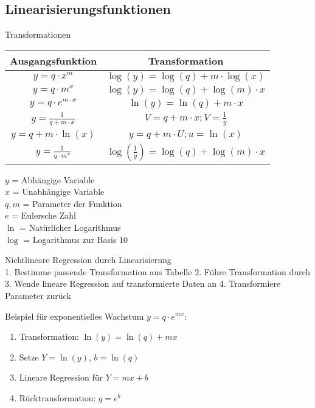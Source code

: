 \subsection{Linearisierungsfunktionen}
\begin{concept}{Transformationen}\\
\begin{center}
\begin{tabular}{|c|c|}
\hline
Ausgangsfunktion & Transformation \\
\hline
$y=q \cdot x^m$ & $\log(y)=\log(q)+m \cdot \log(x)$ \\
\hline
$y=q \cdot m^x$ & $\log(y)=\log(q)+\log(m) \cdot x$ \\
\hline
$y=q \cdot e^{m \cdot x}$ & $\ln(y)=\ln(q)+m \cdot x$ \\
\hline
$y=\frac{1}{q+m \cdot x}$ & $V=q+m \cdot x; V=\frac{1}{y}$ \\
\hline
$y=q+m \cdot \ln(x)$ & $y=q+m \cdot U; u=\ln(x)$ \\
\hline
$y=\frac{1}{q \cdot m^x}$ & $\log(\frac{1}{y})=\log(q)+\log(m) \cdot x$ \\
\hline
\end{tabular}
\end{center}
$y$ = Abhängige Variable\\
$x$ = Unabhängige Variable\\
$q, m$ = Parameter der Funktion\\
$e$ = Eulersche Zahl\\
$\ln$ = Natürlicher Logarithmus\\
$\log$ = Logarithmus zur Basis 10\\
\end{concept}

\begin{KR}{Nichtlineare Regression durch Linearisierung}\\
1. Bestimme passende Transformation aus Tabelle
2. Führe Transformation durch
3. Wende lineare Regression auf transformierte Daten an
4. Transformiere Parameter zurück

Beispiel für exponentielles Wachstum $y=q \cdot e^{mx}$:
\begin{enumerate}
  \item Transformation: $\ln(y)=\ln(q)+mx$
  \item Setze $Y=\ln(y)$, $b=\ln(q)$
  \item Lineare Regression für $Y=mx+b$
  \item Rücktransformation: $q=e^b$
\end{enumerate}
\end{KR}

